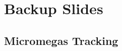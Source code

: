 \section*{}
\begin{frame}{}
    \centering \Huge{}
\end{frame}

\section*{Backup Slides}
\subsection*{Micromegas Tracking}


% 

% 

% 

% 

% 

% 

% 

